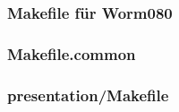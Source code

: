 %
%

\begin{frame}[allowframebreaks]
	\frametitle{Makefile für Worm080}
\end{frame}

\begin{frame}[allowframebreaks]
	\frametitle{Makefile.common}
\end{frame}

\begin{frame}
	\frametitle{presentation/Makefile}
\end{frame}


